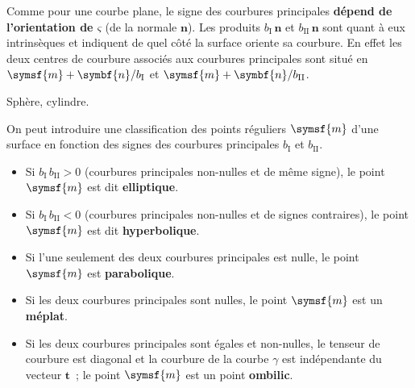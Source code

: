 \documentclass[
  a4paper,
  DIV=11,
  numbers=noendperiod]{scrreprt}
\providecommand{\tightlist}{%
  \setlength{\itemsep}{0pt}\setlength{\parskip}{0pt}}\usepackage{longtable,booktabs,array}
\newcommand{\point}[1]{\symsf{#1}}
\renewcommand{\vec}[1]{\symbf{#1}}
\begin{document}
Comme pour une courbe plane, le signe des courbures principales
\textbf{dépend de l'orientation de \(ς\)} (de la normale \(\vec{n}\)).
Les produits \(b_{\mathrm{I}} \, \vec{n}\) et
\(b_{\mathrm{II}} \, \vec{n}\) sont quant à eux intrinsèques et
indiquent de quel côté la surface oriente sa courbure. En effet les deux
centres de courbure associés aux courbures principales sont situé en
\(\point{m} + \vec{n} / b_{\mathrm{I}}\) et
\(\point{m} + \vec{n} / b_{\mathrm{II}}\).

\begin{tcolorbox}[enhanced jigsaw, toptitle=1mm, title=\textcolor{quarto-callout-warning-color}{\faExclamationTriangle}\hspace{0.5em}{Exemples à traiter en classe}, colbacktitle=quarto-callout-warning-color!10!white, toprule=.15mm, left=2mm, bottomrule=.15mm, arc=.35mm, breakable, opacityback=0, colframe=quarto-callout-warning-color-frame, bottomtitle=1mm, titlerule=0mm, leftrule=.75mm, opacitybacktitle=0.6, coltitle=black, rightrule=.15mm, colback=white]

Sphère, cylindre.

\end{tcolorbox}

On peut introduire une classification des points réguliers \(\point{m}\)
d'une surface en fonction des signes des courbures principales
\(b_{\mathrm{I}}\) et \(b_{\mathrm{II}}\).

\begin{itemize}
\tightlist
\item
  Si \(b_{\mathrm{I}} \, b_{\mathrm{II}} > 0\) (courbures principales
  non-nulles et de même signe), le point \(\point{m}\) est dit
  \textbf{elliptique}.
\item
  Si \(b_{\mathrm{I}} \, b_{\mathrm{II}} < 0\) (courbures principales
  non-nulles et de signes contraires), le point \(\point{m}\) est dit
  \textbf{hyperbolique}.
\item
  Si l'une seulement des deux courbures principales est nulle, le point
  \(\point{m}\) est \textbf{parabolique}.
\item
  Si les deux courbures principales sont nulles, le point \(\point{m}\)
  est un \textbf{méplat}.
\item
  Si les deux courbures principales sont égales et non-nulles, le
  tenseur de courbure est diagonal et la courbure de la courbe \(γ\) est
  indépendante du vecteur \(\vec{t}\)~; le point \(\point{m}\) est un
  point \textbf{ombilic}.
\end{itemize}
\end{document}
